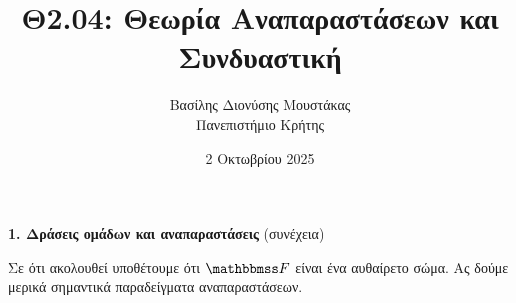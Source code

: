 \documentclass[12pt,a4paper,reqno]{amsart}
\title{Θ2.04: Θεωρία Αναπαραστάσεων και Συνδυαστική}
\author[Β.~Δ. Μουστακας]{Βασίλης Διονύσης Μουστάκας \\ Πανεπιστήμιο Κρήτης}
\date{2 Οκτωβρίου 2025}
\begin{document}
\begingroup
\def\uppercasenonmath#1{} %
\let\MakeUppercase\relax %
\maketitle
\endgroup

\setcounter{section}{1}
\setcounter{theorem}{4} %
\setcounter{equation}{1} %
\thispagestyle{empty}

\begin{center}
    \textbf{1. Δράσεις ομάδων και αναπαραστάσεις} (συνέχεια)
\end{center}

Σε ότι ακολουθεί υποθέτουμε ότι $\FF$ είναι ένα αυθαίρετο σώμα. Ας δούμε μερικά σημαντικά παραδείγματα αναπαραστάσεων.
\end{document}
